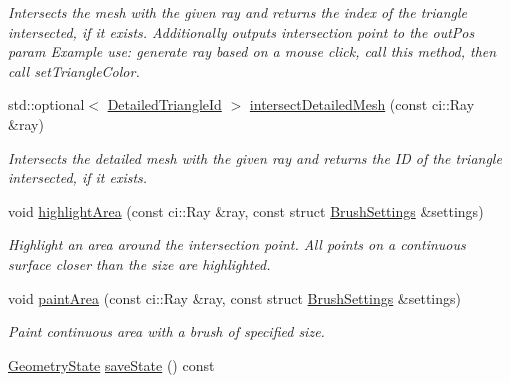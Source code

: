 \begin{DoxyCompactItemize}
\begin{DoxyCompactList}\small\item\em Intersects the mesh with the given ray and returns the index of the triangle intersected, if it exists. Additionally outputs intersection point to the out\+Pos param Example use\+: generate ray based on a mouse click, call this method, then call set\+Triangle\+Color. \end{DoxyCompactList}\item 
std\+::optional$<$ \mbox{\hyperlink{structpepr3d_1_1_detailed_triangle_id}{Detailed\+Triangle\+Id}} $>$ \mbox{\hyperlink{classpepr3d_1_1_geometry_ae68a633ab4ab435156e0b03e64c9ede9}{intersect\+Detailed\+Mesh}} (const ci\+::\+Ray \&ray)
\begin{DoxyCompactList}\small\item\em Intersects the detailed mesh with the given ray and returns the ID of the triangle intersected, if it exists. \end{DoxyCompactList}\item 
\mbox{\label{classpepr3d_1_1_geometry_a69f784973726ce83893d8ec3fcdf9ff1}} 
void \mbox{\hyperlink{classpepr3d_1_1_geometry_a69f784973726ce83893d8ec3fcdf9ff1}{highlight\+Area}} (const ci\+::\+Ray \&ray, const struct \mbox{\hyperlink{structpepr3d_1_1_brush_settings}{Brush\+Settings}} \&settings)
\begin{DoxyCompactList}\small\item\em Highlight an area around the intersection point. All points on a continuous surface closer than the size are highlighted. \end{DoxyCompactList}\item 
\mbox{\label{classpepr3d_1_1_geometry_a7aed460807700001c27788aaf90ad17e}} 
void \mbox{\hyperlink{classpepr3d_1_1_geometry_a7aed460807700001c27788aaf90ad17e}{paint\+Area}} (const ci\+::\+Ray \&ray, const struct \mbox{\hyperlink{structpepr3d_1_1_brush_settings}{Brush\+Settings}} \&settings)
\begin{DoxyCompactList}\small\item\em Paint continuous area with a brush of specified size. \end{DoxyCompactList}\item 
\mbox{\label{classpepr3d_1_1_geometry_a80198ecc7f17d1db360ab2bf50b7f594}} 
\mbox{\hyperlink{structpepr3d_1_1_geometry_1_1_geometry_state}{Geometry\+State}} \mbox{\hyperlink{classpepr3d_1_1_geometry_a80198ecc7f17d1db360ab2bf50b7f594}{save\+State}} () const

\end{DoxyCompactItemize}
